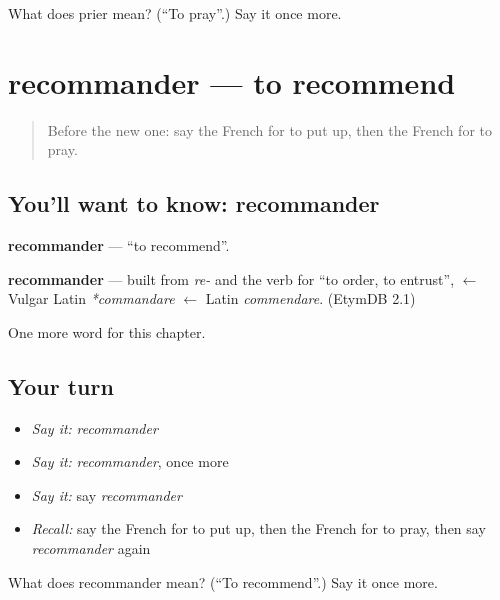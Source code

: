 \begin{tcolorbox}[breakable,colback=teal!4,colframe=teal!35!black,title={Before you move on}]
What does prier mean? (\textquotedblleft{}To pray\textquotedblright{}.) Say it once more.
\end{tcolorbox}
\section[recommander]{recommander — to recommend}

\label{lesson:FR-C151-recommander}



\begin{quote}
Before the new one: say the French for to put up, then the French for to pray.
\end{quote}

\subsection*{You'll want to know: recommander}
\textbf{recommander} — \textquotedblleft{}to recommend\textquotedblright{}.

\begin{cousinweb}
\textbf{recommander} — built from \emph{re-} and the verb for \textquotedblleft{}to order, to entrust\textquotedblright{}, $\leftarrow$ Vulgar Latin \emph{*commandare} $\leftarrow$ Latin \emph{commendare}. (EtymDB 2.1)
\end{cousinweb}

\begin{grammarlens}[title={What you've built}]
One more word for this chapter.
\end{grammarlens}

\subsection*{Your turn}
\begin{itemize}
\raggedright
  \item \emph{Say it:} \emph{recommander}
  \item \emph{Say it:} \emph{recommander}, once more
  \item \emph{Say it:} say \emph{recommander}
  \item \emph{Recall:} say the French for to put up, then the French for to pray, then say \emph{recommander} again
\end{itemize}

\begin{tcolorbox}[breakable,colback=teal!4,colframe=teal!35!black,title={Before you move on}]
What does recommander mean? (\textquotedblleft{}To recommend\textquotedblright{}.) Say it once more.
\end{tcolorbox}
